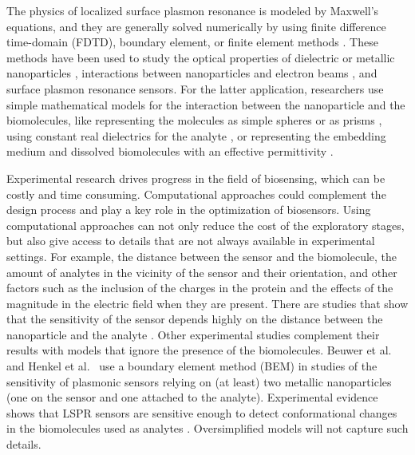 The physics of localized surface plasmon resonance is modeled by Maxwell's equations, and they are generally solved numerically 
by using finite difference time-domain (FDTD), boundary element, or finite element methods \cite{SolisTaboadaObelleiroLiz-MaarzanGarciadeabajo2014}.
These methods have been used to study the optical properties of dielectric or metallic nanoparticles \cite{Hohenester2018,HohenesterTrugler2012,
JungPedersenSondergaardPedersenLarsenNielsen2010, VideenSun2003,MayergoyzFredkinZhang2005, MayergoyzZhang2007}, interactions between nanoparticles
and electron beams \cite{GarciadeabajoAizpurua1997, GarciadeabajoHowie2002}, and surface plasmon resonance sensors. For the latter application, 
researchers use simple mathematical models for the interaction between the nanoparticle and the biomolecules, like representing the molecules as simple 
spheres \cite{DavisGomezVernon2010,AntosiewiczApellClaudioKall2011, SantiagoCordobaETal2011, ShenETal2013, UngerETal2009} or as prisms \cite{DanHu2014}, using 
constant real dielectrics for the analyte \cite{NghiemETal2012, SantiagoCordobaETal2011, ShenETal2013, UngerETal2009}, or representing the embedding medium 
and dissolved biomolecules with an effective permittivity \cite{JungCampbellChinowskyMarYee1998,WilletsVandyune2007,PhanETal2013}.

Experimental research drives progress in the field of biosensing, which can be costly and time consuming. Computational approaches could 
complement the design process and play a key role in the optimization of biosensors. Using computational approaches
can not only reduce the cost of the exploratory stages, but also give access to details that are not always available in experimental settings. For example, 
the distance between the sensor and the biomolecule, the amount of analytes in the vicinity of the sensor and their orientation, and other factors such as
the inclusion of the charges in the protein and the effects of the magnitude in the electric field when they are present. There are studies that show that 
the sensitivity of the sensor depends highly on the distance between the nanoparticle and the analyte \cite{HaesETal2004}. Other experimental studies complement
their results with models that ignore the presence of the biomolecules. Beuwer et al.~\cite{BeuwervanHoofZijlstra2018} and Henkel et al.~\cite{HenkelETal2018} 
use a boundary element method (BEM) in studies of the sensitivity of plasmonic sensors relying on (at least) two metallic nanoparticles 
(one on the sensor and one attached to the analyte). Experimental evidence shows that LSPR sensors are sensitive enough to detect conformational
changes in the biomolecules used as analytes \cite{HallETal2011}. Oversimplified models will not capture such details. 


